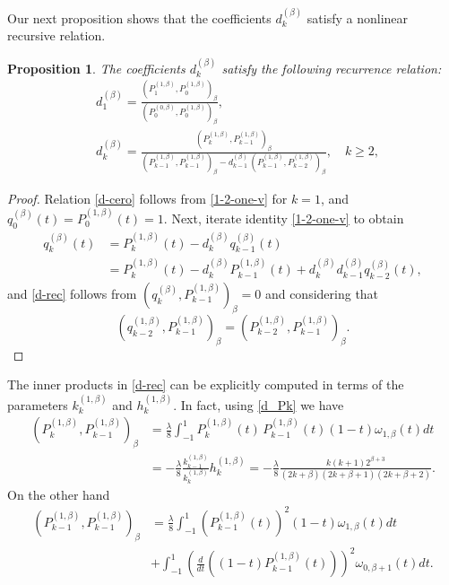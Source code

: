 \documentclass{amsart}
\theoremstyle{plain}%
\newtheorem{prop}[thm]{Proposition}
\theoremstyle{definition}
\theoremstyle{remark}
\begin{document}
 
Our next proposition shows that the coefficients  $d_k^{(\beta)}$ satisfy a nonlinear recursive relation. 

\begin{prop}
The coefficients $d_{k}^{(\beta)}$ satisfy the following recurrence relation:
\begin{align}
& d_1^{(\beta)} = \frac{(P_{1}^{(1, \beta)}, P_{0}^{(1,\beta)})_{\beta}}{(P_{0}^{(0, \beta)}, P_{0}^{(1,\beta)})_{\beta}},\label{d-cero}\\
& d_{k}^{(\beta)} = \frac{(P_{k}^{(1, \beta)}, P_{k-1}^{(1,\beta)})_{\beta}}{(P_{k-1}^{(1, \beta)}, P_{k-1}^{(1,\beta)})_{\beta} - d_{k-1}^{(\beta)} \, (P_{k-1}^{(1, \beta)}, P_{k-2}^{(1,\beta)})_{\beta}},\quad k\ge 2,\label{d-rec}
\end{align}
\end{prop}

\begin{proof}
Relation \eqref{d-cero} follows from \eqref{1-2-one-v} for \(k = 1\), and
\(q_0^{(\beta)}(t) = P_0^{(1, \beta)}(t) = 1\).
Next, iterate identity \eqref{1-2-one-v} to obtain
\begin{align*}
q_k^{(\beta)}(t) &= P_k^{(1, \beta)}(t) - d_{k}^{(\beta)}q_{k-1}^{(\beta)}(t)\\
& =  P_k^{(1, \beta)}(t) - d_{k}^{(\beta)}P_{k-1}^{(1, \beta)}(t) + d_{k}^{(\beta)} d_{k-1}^{(\beta)} q_{k-2}^{(\beta)}(t),
\end{align*}
and \eqref{d-rec} follows from \((q_{k}^{(\beta)}, P_{k-1}^{(1,\beta)})_{\beta}= 0\) and considering that \[(q_{k-2}^{(1, \beta)}, P_{k-1}^{(1,\beta)})_{\beta} = (P_{k-2}^{(1, \beta)}, P_{k-1}^{(1,\beta)})_{\beta}.\]
\end{proof}

\bigskip

The inner products in \eqref{d-rec} can be explicitly computed in terms of the parameters \(k_k^{(1,\beta)}\) and \(h_k^{(1,\beta)}\). In fact, using \eqref{d_Pk} we have
\begin{align*}
(P_{k}^{(1, \beta)}, P_{k-1}^{(1,\beta)})_{\beta} &= 
 \frac{\lambda}{8} \int_{-1}^1 P_{k}^{(1, \beta)}(t)\, P_{k-1}^{(1,\beta)}(t) (1-t) \omega_{1,\beta}(t) dt \\
&= - \frac{\lambda}{8} \frac{k_{k-1}^{(1,\beta)}}{k_{k}^{(1,\beta)}} h_{k}^{(1,\beta)} = - \frac{\lambda}{8} \frac{ k (k+1) 2^{\beta+3}}{(2k+\beta)(2k+\beta+1)(2k+\beta+2)}.
\end{align*} 
On the other hand
\begin{align*}
(P_{k-1}^{(1, \beta)}, P_{k-1}^{(1,\beta)})_{\beta} &= 
 \frac{\lambda}{8} \int_{-1}^1 \left(P_{k-1}^{(1, \beta)}(t)\right)^2 (1-t) \omega_{1,\beta}(t) dt \\
&+ \int_{-1}^1 \left(\frac{d}{dt}\left((1-t)P_{k-1}^{(1, \beta)}(t)\right)\right)^2  \omega_{0,\beta+1}(t) dt.
\end{align*} 
\end{document}
